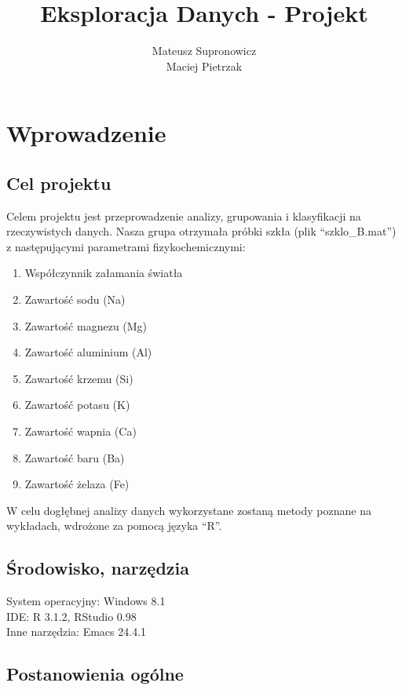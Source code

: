 \documentclass[a4paper,12pt,twoside]{article}
\title{ Eksploracja Danych - Projekt}
\author{ Mateusz Supronowicz \\ Maciej Pietrzak}
\begin{document}
\maketitle
\newpage
\tableofcontents
\newpage

\section{Wprowadzenie}
\bigskip


\subsection{Cel projektu}

Celem projektu jest przeprowadzenie analizy, grupowania i klasyfikacji na rzeczywistych danych.
Nasza grupa otrzymała próbki szkła (plik ``szklo\_B.mat'') z następującymi parametrami fizykochemicznymi:
\begin{enumerate}
\item Współczynnik załamania światła
\item Zawartość sodu (Na)
\item Zawartość magnezu (Mg)
\item Zawartość aluminium (Al)
\item Zawartość krzemu (Si)
\item Zawartość potasu (K)
\item Zawartość wapnia (Ca)
\item Zawartość baru (Ba)
\item Zawartość żelaza (Fe)
\end{enumerate}

W celu dogłębnej analizy danych wykorzystane zostaną metody poznane na wykładach, wdrożone za
pomocą języka ``R''.

\subsection{Środowisko, narzędzia}

System operacyjny: Windows 8.1\\
IDE: R 3.1.2, RStudio 0.98\\
Inne narzędzia: Emacs 24.4.1\\

\subsection{Postanowienia ogólne}
\end{document}
